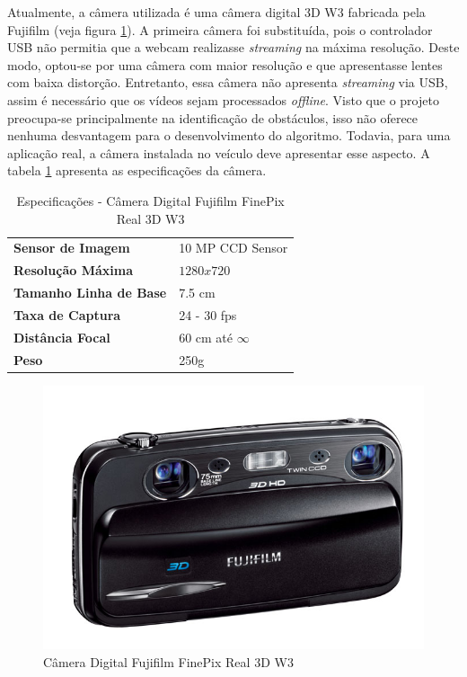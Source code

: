 Atualmente, a câmera utilizada é uma câmera digital 3D W3 fabricada pela Fujifilm (veja figura \ref{fujiW3}). A primeira câmera foi substituída, pois o controlador USB não permitia que a webcam realizasse \textit{streaming} na máxima resolução. Deste modo, optou-se por uma câmera com maior resolução e que apresentasse lentes com baixa distorção. Entretanto, essa câmera não apresenta \textit{streaming} via USB, assim é necessário que os vídeos sejam processados \textit{offline}. Visto que o projeto preocupa-se principalmente na identificação de obstáculos, isso não oferece nenhuma desvantagem para o desenvolvimento do algoritmo. Todavia, para uma aplicação real, a câmera instalada no veículo deve apresentar esse aspecto. A tabela \ref{fujiW3_tab} apresenta as especificações da câmera.

\begin{table}[]
\centering
\caption{Especificações - Câmera Digital Fujifilm FinePix Real 3D W3}
\label{fujiW3_tab}
\begin{tabular}{ll}
\textbf{Sensor de Imagem}      & 10 MP CCD Sensor  	\\
\textbf{Resolução Máxima}      & $1280x720$        	\\
\textbf{Tamanho Linha de Base} & 7.5 cm             	\\
\textbf{Taxa de Captura}      & 24 - 30 fps          \\
\textbf{Distância Focal}       & 60 cm até $\infty$	\\
\textbf{Peso}       		      & 250g					\\
\end{tabular}
\end{table}

\begin{figure}[H]
	\centering
	\includegraphics[scale=0.35]{./Resources/fujiW3.jpg}
	\caption{Câmera Digital Fujifilm FinePix Real 3D W3}
	\label{fujiW3}
\end{figure}


